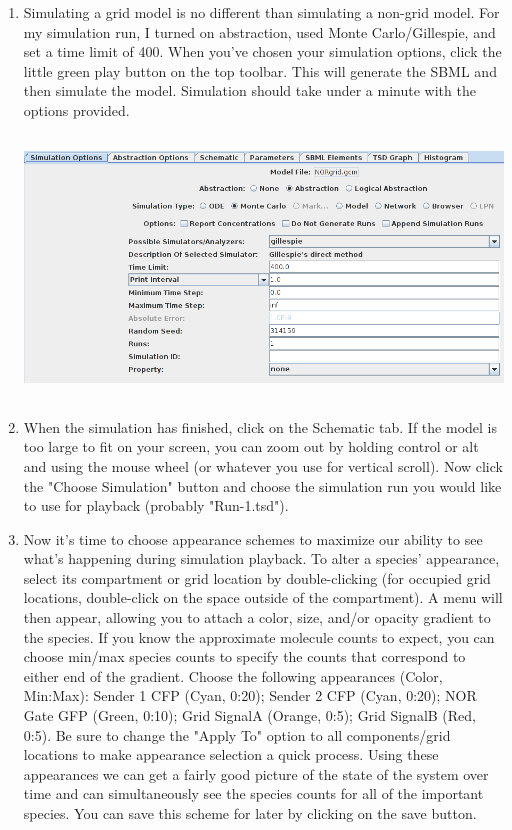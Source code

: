 \documentclass[titlepage,11pt]{article}
\begin{document}
\begin{enumerate}

\item Simulating a grid model is no different than simulating a non-grid model.  For my simulation run, I turned on abstraction, used Monte Carlo/Gillespie, and set a time limit of 400.  When you've chosen your simulation options, click the little green play button on the top toolbar.  This will generate the SBML and then simulate the model.  Simulation should take under a minute with the options provided.

\includegraphics[height=70mm]{screenshots/grid_sim_options}

\item When the simulation has finished, click on the Schematic tab.  If the model is too large to fit on your screen, you can zoom out by holding control or alt and using the mouse wheel (or whatever you use for vertical scroll).  Now click the "Choose Simulation" button and choose the simulation run you would like to use for playback (probably "Run-1.tsd").

\item Now it's time to choose appearance schemes to maximize our ability to see what's happening during simulation playback.  To alter a species' appearance, select its compartment or grid location by double-clicking (for occupied grid locations, double-click on the space outside of the compartment).  A menu will then appear, allowing you to attach a color, size, and/or opacity gradient to the species.  If you know the approximate molecule counts to expect, you can choose min/max species counts to specify the counts that correspond to either end of the gradient.  Choose the following appearances (Color, Min:Max): Sender 1 CFP (Cyan, 0:20); Sender 2 CFP (Cyan, 0:20); NOR Gate GFP (Green, 0:10); Grid SignalA (Orange, 0:5); Grid SignalB (Red, 0:5).  Be sure to change the "Apply To" option to all components/grid locations to make appearance selection a quick process.  Using these appearances we can get a fairly good picture of the state of the system over time and can simultaneously see the species counts for all of the important species.  You can save this scheme for later by clicking on the save button.


\end{enumerate}
\end{document}

